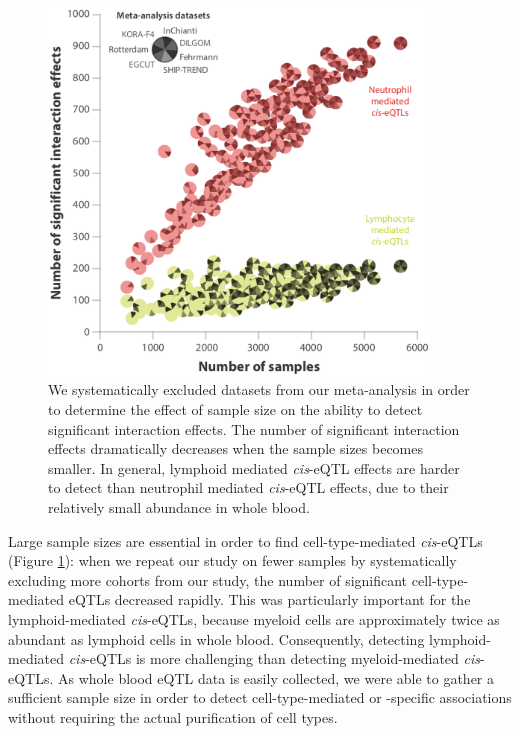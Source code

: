   \begin{figure}[h!]
  \centering
  \includegraphics[width=0.9\textwidth]{eps/image_4_5.eps}
  \caption[Validation]{We systematically excluded datasets from our meta-analysis in order to determine the effect 
                       of sample size on the ability to detect significant interaction effects. The number of 
                       significant interaction effects dramatically decreases when the sample sizes becomes smaller. 
                       In general, lymphoid mediated \emph{cis}-eQTL effects are harder to detect than neutrophil mediated 
                       \emph{cis}-eQTL effects, due to their relatively small abundance in whole blood.  }
          \label{fig:fig4_5}
  \end{figure}

  Large sample sizes are essential in order to find cell-type-mediated \emph{cis}-eQTLs (Figure \ref{fig:fig4_5}): when we repeat our study on fewer samples 
  by systematically excluding more cohorts from our study, the number of significant cell-type-mediated eQTLs decreased 
  rapidly. This was particularly important for the lymphoid-mediated \emph{cis}-eQTLs, because myeloid cells are approximately twice as abundant 
  as lymphoid cells in whole blood. Consequently, detecting lymphoid-mediated \emph{cis}-eQTLs is more challenging than detecting myeloid-mediated 
  \emph{cis}-eQTLs. As whole blood eQTL data is easily collected, we were able to gather a sufficient sample size in order to detect 
  cell-type-mediated or -specific associations without requiring the actual purification of cell types. 

